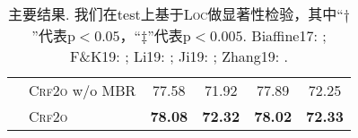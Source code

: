 \begin{table}[tb!]
\begin{tabular}{llcccc}
                             & \textsc{Crf2o} w/o MBR & 77.58                   & 71.92                    & 77.89                            & 72.25                            \\
                             & \textsc{Crf2o}         & \textbf{78.08}          & \textbf{72.32}           & \textbf{78.02}\rlap{$^\ddagger$} & \textbf{72.33}\rlap{$^\ddagger$} \\
    \bottomrule
  \end{tabular}
  \caption{主要结果. 我们在test上基于\textsc{Loc}做显著性检验，其中``$\dagger$''代表$\mathrm{p} < 0.05$，``$\ddagger$''代表$\mathrm{p} < 0.005$.
    Biaffine17: \cite{dozat-etal-2017-biaffine}; F\&K19: \cite{falenska-kuhn-2019-non};
    Li19: \cite{li-etal-2019-attentive}; Ji19: \cite{ji-etal-2019-graph};
    Zhang19: \cite{zhang-etal-2019-empirical}.
  }
  \label{table:dev-test}
\end{table}


